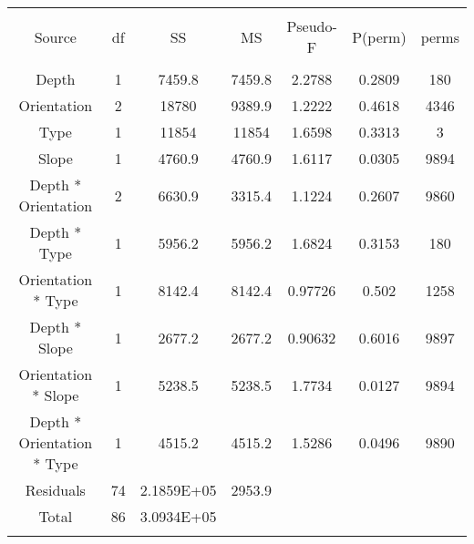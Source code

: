 \documentclass{article}
\begin{document}
\begin{table}[!htbp] \centering 
  \caption*{} 
  \label{} 
\begin{tabular}{@{\extracolsep{5pt}} ccccccc} 
\\[-1.8ex]\hline 
\hline \\[-1.8ex] 
Source & df & SS & MS & Pseudo-F  & P(perm) & perms\\ 
\hline \\[-1.8ex] 
Depth & 1	 &   7459.8	&7459.8&	  2.2788	& 0.2809&	   180 \\ 
Orientation & 2& 18780	&9389.9	&  1.2222	& 0.4618	&  4346 \\ 
Type &1	 &    11854&	 11854&	  1.6598&	 0.3313&	     3 \\ 
Slope & 1	&    4760.9	&4760.9&	  1.6117	& 0.0305	 & 9894 \\ 
Depth * Orientation &2	&    6630.9&	3315.4&	  1.1224	& 0.2607	&  9860 \\ 
Depth * Type	&1	 &   5956.2	&5956.2&	  1.6824	 &0.3153	 &  180 \\
Orientation * Type & 1	&    8142.4	&8142.4&	 0.97726&	  0.502&	  1258 \\
Depth * Slope & 1	&    2677.2&	2677.2&	 0.90632	& 0.6016	&  9897\\
Orientation * Slope & 1	&    5238.5	&5238.5&	  1.7734	& 0.0127	&  9894\\
Depth * Orientation * Type &	 1	&    4515.2	&4515.2&	  1.5286&	 0.0496	 & 9890\\
Residuals &	74	&2.1859E+05	&2953.9\\
Total &	86	&3.0934E+05\\	
\hline \\[-1.8ex] 
\end{tabular} 
\end{table} 
\end{document}
